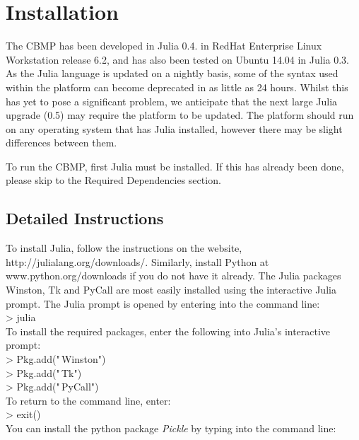 \documentclass[12pt]{article}
\begin{document}
\section{Installation}
The CBMP has been developed in Julia 0.4. in RedHat Enterprise Linux 
Workstation release 6.2, and has also been tested on Ubuntu 14.04 in 
Julia 0.3. As the Julia language is updated on a nightly basis, some of 
the syntax used within the platform can become deprecated in as little 
as 24 hours. Whilst this has yet to pose a significant problem, we 
anticipate that the next large Julia upgrade (0.5) may require the 
platform to be updated. The platform should run on any operating system 
that has Julia installed, however there may be slight differences 
between them.

To run the CBMP, first Julia must be installed. If this has already been 
done, please skip to the Required Dependencies section.

\subsection{Detailed Instructions}
To install Julia, follow the instructions on the website, 
http://julialang.org/downloads/. Similarly,
install Python at www.python.org/downloads if you do not have it already. 
The Julia packages Winston, Tk and PyCall are most easily installed 
using the interactive Julia prompt. The Julia prompt is opened by entering
into the command line: \\

{\fontsize{11pt}{11pt} \ttfamily 
> julia} \\

To install the required packages, enter the following into Julia's interactive prompt: \\

{\fontsize{11pt}{11pt} \ttfamily 
> Pkg.add("\,Winston") \\

> Pkg.add("\,Tk") \\

> Pkg.add("\,PyCall")} \\ 

To return to the command line, enter: \\

{\fontsize{11pt}{11pt} \ttfamily 
> exit()} \\

You can install the python package {\itshape Pickle} by typing into the command line: \\
\end{document}
